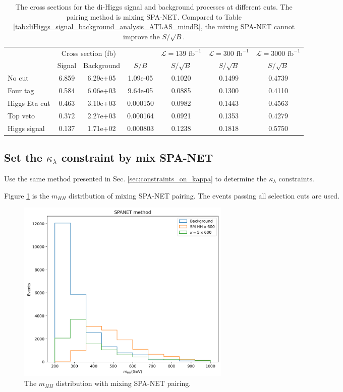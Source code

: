 \documentclass[12pt]{article}
\begin{document}
		\begin{table}[htpb]
			\centering
			\caption{The cross sections for the di-Higgs signal and background processes at different cuts. The pairing method is mixing SPA-NET. Compared to Table \ref{tab:diHiggs_signal_background_analysis_ATLAS_mindR}, the mixing SPA-NET cannot improve the $S/\sqrt{B}$.}
			\label{tab:diHiggs_signal_background_analysis_ATLAS_mix_SPANET}
			\begin{tabular}{l|cc|c|c|c|c}
							 & \multicolumn{2}{c|}{Cross section (fb)} &          & $\mathcal{L} = 139 \text{ fb}^{-1}$ & $\mathcal{L} = 300 \text{ fb}^{-1}$ & $\mathcal{L} = 3000 \text{ fb}^{-1}$ \\
							 & Signal           & Background           & $S / B$  & $S/\sqrt{B}$                        & $S/\sqrt{B}$                        & $S/\sqrt{B}$                         \\ \hline
				No cut        & 6.859 & 6.29e+05 & 1.09e-05 & 0.1020 & 0.1499 & 0.4739 \\
				Four tag      & 0.584 & 6.06e+03 & 9.64e-05 & 0.0885 & 0.1300 & 0.4110 \\
				Higgs Eta cut & 0.463 & 3.10e+03 & 0.000150 & 0.0982 & 0.1443 & 0.4563 \\
				Top veto      & 0.372 & 2.27e+03 & 0.000164 & 0.0921 & 0.1353 & 0.4279 \\
				Higgs signal  & 0.137 & 1.71e+02 & 0.000803 & 0.1238 & 0.1818 & 0.5750
			\end{tabular}
		\end{table}

	\subsection{Set the \texorpdfstring{$\kappa_\lambda$}{kappa} constraint by mix SPA-NET}%
	\label{sub:set_the_kappa_constraint_by_mix_spa_net}
		Use the same method presented in Sec. \ref{sec:constraints_on_kappa} to determine the $\kappa_\lambda$ constraints.

		Figure  \ref{fig:mhh_distribution_SPANET_mix} is the $m_{HH}$ distribution of mixing SPA-NET pairing. The events passing all selection cuts are used.
		\begin{figure}[htpb]
			\centering
			\includegraphics[width=0.5\textwidth]{mhh_distribution_SPANET-mix.png}
			\caption{The $m_{H H}$ distribution with mixing SPA-NET pairing.}
			\label{fig:mhh_distribution_SPANET_mix}
		\end{figure}
\end{document}

